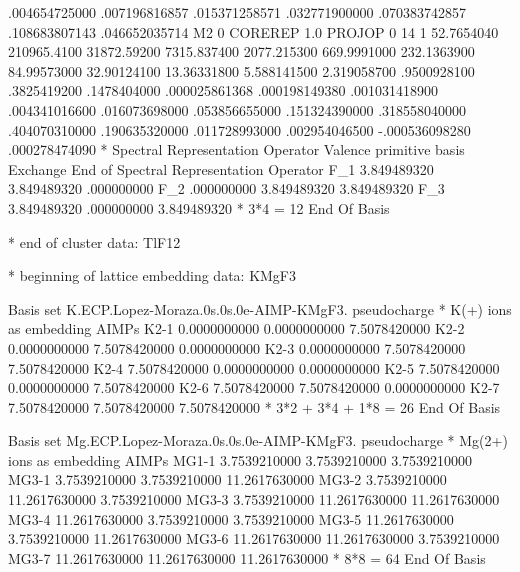 \begin{inputlisting}
   .004654725000
   .007196816857
   .015371258571
   .032771900000
   .070383742857
   .108683807143
   .046652035714
M2
    0
COREREP
   1.0
PROJOP
    0
   14    1
  52.7654040
   210965.4100
   31872.59200
   7315.837400
   2077.215300
   669.9991000
   232.1363900
   84.99573000
   32.90124100
   13.36331800
   5.588141500
   2.319058700
   .9500928100
   .3825419200
   .1478404000
   .000025861368
   .000198149380
   .001031418900
   .004341016600
   .016073698000
   .053856655000
   .151324390000
   .318558040000
   .404070310000
   .190635320000
   .011728993000
   .002954046500
  -.000536098280
   .000278474090
*
Spectral Representation Operator
Valence primitive basis
Exchange
End of Spectral Representation Operator
F_1        3.849489320       3.849489320        .000000000
F_2         .000000000       3.849489320       3.849489320
F_3        3.849489320        .000000000       3.849489320
* 3*4 = 12
End Of Basis

* end of cluster data: TlF12

* beginning of lattice embedding data: KMgF3

Basis set
K.ECP.Lopez-Moraza.0s.0s.0e-AIMP-KMgF3. 
pseudocharge
* K(+) ions as embedding AIMPs 
K2-1    0.0000000000   0.0000000000   7.5078420000
K2-2    0.0000000000   7.5078420000   0.0000000000
K2-3    0.0000000000   7.5078420000   7.5078420000
K2-4    7.5078420000   0.0000000000   0.0000000000
K2-5    7.5078420000   0.0000000000   7.5078420000
K2-6    7.5078420000   7.5078420000   0.0000000000
K2-7    7.5078420000   7.5078420000   7.5078420000
* 3*2 + 3*4 + 1*8 = 26
End Of Basis

Basis set
Mg.ECP.Lopez-Moraza.0s.0s.0e-AIMP-KMgF3. 
pseudocharge
* Mg(2+) ions as embedding AIMPs 
MG1-1   3.7539210000   3.7539210000   3.7539210000
MG3-1   3.7539210000   3.7539210000  11.2617630000
MG3-2   3.7539210000  11.2617630000   3.7539210000
MG3-3   3.7539210000  11.2617630000  11.2617630000
MG3-4  11.2617630000   3.7539210000   3.7539210000
MG3-5  11.2617630000   3.7539210000  11.2617630000
MG3-6  11.2617630000  11.2617630000   3.7539210000
MG3-7  11.2617630000  11.2617630000  11.2617630000
* 8*8 = 64
End Of Basis


\end{inputlisting}
